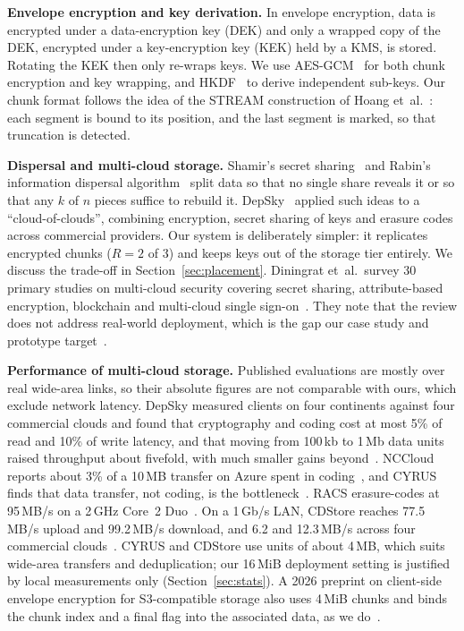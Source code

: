 \documentclass[conference]{IEEEtran}
\begin{document}
\textbf{Envelope encryption and key derivation.} In envelope encryption, data is encrypted under a data-encryption key (DEK) and only a wrapped copy of the DEK, encrypted under a key-encryption key (KEK) held by a KMS, is stored. Rotating the KEK then only re-wraps keys. We use AES-GCM~\cite{nist80038d} for both chunk encryption and key wrapping, and HKDF~\cite{rfc5869} to derive independent sub-keys. Our chunk format follows the idea of the STREAM construction of Hoang et~al.~\cite{hoang2015stream}: each segment is bound to its position, and the last segment is marked, so that truncation is detected.

\textbf{Dispersal and multi-cloud storage.} Shamir's secret sharing~\cite{shamir1979} and Rabin's information dispersal algorithm~\cite{rabin1989} split data so that no single share reveals it or so that any $k$ of $n$ pieces suffice to rebuild it. DepSky~\cite{bessani2011depsky} applied such ideas to a ``cloud-of-clouds'', combining encryption, secret sharing of keys and erasure codes across commercial providers. Our system is deliberately simpler: it replicates encrypted chunks ($R=2$ of 3) and keeps keys out of the storage tier entirely. We discuss the trade-off in Section~\ref{sec:placement}. Diningrat et~al.\ survey 30 primary studies on multi-cloud security covering secret sharing, attribute-based encryption, blockchain and multi-cloud single sign-on~\cite{diningrat2025}. They note that the review does not address real-world deployment, which is the gap our case study and prototype target~\cite{casestudy2026}.

\textbf{Performance of multi-cloud storage.} Published evaluations are mostly over real wide-area links, so their absolute figures are not comparable with ours, which exclude network latency. DepSky measured clients on four continents against four commercial clouds and found that cryptography and coding cost at most 5\% of read and 10\% of write latency, and that moving from 100\,kb to 1\,Mb data units raised throughput about fivefold, with much smaller gains beyond~\cite{bessani2011depsky}. NCCloud reports about 3\% of a 10\,MB transfer on Azure spent in coding~\cite{hu2012nccloud}, and CYRUS finds that data transfer, not coding, is the bottleneck~\cite{chung2015cyrus}. RACS erasure-codes at 95\,MB/s on a 2\,GHz Core~2 Duo~\cite{abulibdeh2010racs}. On a 1\,Gb/s LAN, CDStore reaches 77.5\,MB/s upload and 99.2\,MB/s download, and 6.2 and 12.3\,MB/s across four commercial clouds~\cite{li2015cdstore}. CYRUS and CDStore use units of about 4\,MB, which suits wide-area transfers and deduplication; our 16\,MiB deployment setting is justified by local measurements only (Section~\ref{sec:stats}). A 2026 preprint on client-side envelope encryption for S3-compatible storage also uses 4\,MiB chunks and binds the chunk index and a final flag into the associated data, as we do~\cite{lingala2026}.
\end{document}

